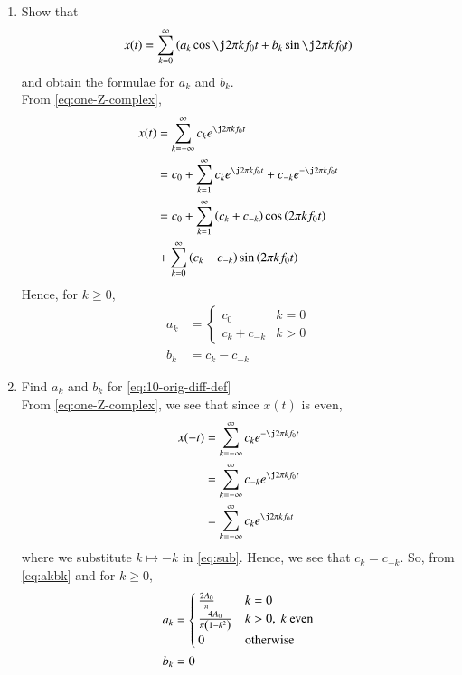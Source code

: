 \documentclass[journal,12pt,twocolumn]{IEEEtran}
\renewcommand\thesection{\arabic{section}}
\begin{document}
\begin{enumerate}[label=\thesection.\arabic*,ref=\thesection.\theenumi]
	\item Show that 
\begin{align}
	x(t) = \sum_{k = 0}^{\infty}\brak{a_k\cos{\j2\pi kf_0 t}+b_k\sin{\j2\pi kf_0 t}}
\label{eq:one-Z-real}
\end{align}
and obtain the formulae for $a_k$ and $b_k$.\\
\solution From \eqref{eq:one-Z-complex},
\begin{align}
    x(t) &= \sum_{k = -\infty}^{\infty}c_ke^{\j2\pi kf_0 t} \\
         &= c_0 + \sum_{k = 1}^{\infty}c_ke^{\j2\pi kf_0t} + c_{-k}e^{-\j2\pi kf_0t} \\
         &= c_0 + \sum_{k = 1}^{\infty}\brak{c_k + c_{-k}}\cos\brak{2\pi kf_0t}  \nonumber \\
         &+ \sum_{k = 0}^{\infty}\brak{c_k - c_{-k}}\sin\brak{2\pi kf_0t}
\end{align}
Hence, for $k \ge 0$,
\begin{align}
    a_k &= 
    \begin{cases}
        c_0 & k = 0 \\
        c_k + c_{-k} & k > 0
    \end{cases} \\
    b_k &= c_k - c_{-k}
    \label{eq:akbk}
\end{align}
\item Find $a_k$ and $b_k$ for 
	\eqref{eq:10-orig-diff-def}\\
	\solution From \eqref{eq:one-Z-complex}, we see that since $x(t)$ is even,
\begin{align}
    x(-t) &= \sum_{k = -\infty}^{\infty}c_ke^{-\j2\pi kf_0 t} \\
          &= \sum_{k = -\infty}^{\infty}c_{-k}e^{\j2\pi kf_0t} \label{eq:sub} \\
          &= \sum_{k = -\infty}^{\infty}c_ke^{\j2\pi kf_0 t}
\end{align}
where we substitute $k \mapsto -k$ in \eqref{eq:sub}. Hence, we see that 
$c_k = c_{-k}$. So, from \eqref{eq:akbk} and for $k \ge 0$,
\begin{align}
    a_k &= 
    \begin{cases}
        \frac{2A_0}{\pi} & k = 0 \\
        \frac{4A_0}{\pi\left(1 - k^2\right)} & k > 0,\ k\ \text{even} \\
        0 & \text{otherwise}
    \end{cases} \\
    b_k &= 0
    \label{eq:akbk-even}
\end{align}

\end{enumerate}
\end{document}
